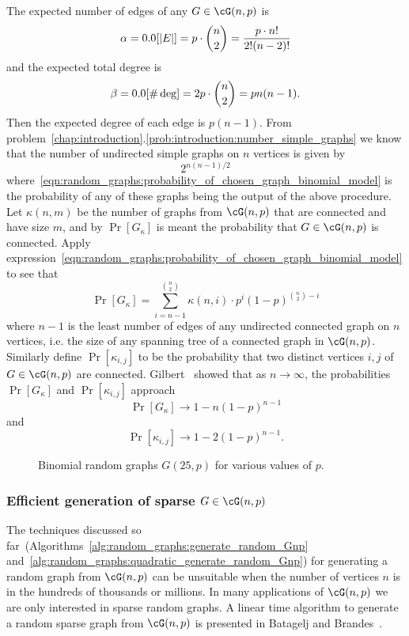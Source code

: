 The expected number of edges of any $G \in \cG(n,p)$ is
\[
\alpha
=
\E[|E|]
=
p \cdot \binom{n}{2}
=
\frac{p \cdot n!} {2! (n - 2)!}
\]
and the expected total degree is
\[
\beta
=
\E[\#\deg]
=
2p \cdot \binom{n}{2}
=
pn(n - 1).
\]
Then the expected degree of each edge is $p(n - 1)$. From
problem~\ref{chap:introduction}.\ref{prob:introduction:number_simple_graphs}
we know that the number of undirected simple graphs on $n$ vertices is
given by
\[
2^{n(n-1) / 2}
\]
where~\eqref{eqn:random_graphs:probability_of_chosen_graph_binomial_model}
is the probability of any of these graphs being the output of the
above procedure. Let $\kappa(n,m)$ be the number of graphs from
$\cG(n,p)$ that are connected and have size $m$, and by $\Pr[G_\kappa]$
is meant the probability that $G \in \cG(n,p)$ is connected. Apply
expression~\eqref{eqn:random_graphs:probability_of_chosen_graph_binomial_model}
to see that
\[
\Pr[G_\kappa]
=
\sum_{i=n-1}^{\binom{n}{2}}
\kappa(n,i) \cdot p^i (1 - p)^{\binom{n}{2} - i}
\]
where $n - 1$ is the least number of edges of any undirected connected
graph on $n$ vertices, i.e. the size of any spanning tree of a
connected graph in $\cG(n,p)$. Similarly define $\Pr[\kappa_{i,j}]$ to
be the probability that two distinct vertices $i,j$ of
$G \in \cG(n,p)$ are connected. Gilbert~\cite{Gilbert1959} showed that
as $n \to \infty$, the probabilities $\Pr[G_\kappa]$ and
$\Pr[\kappa_{i,j}]$ approach
\[
\Pr[G_\kappa] \to 1 - n(1 - p)^{n-1}
\]
and
\[
\Pr[\kappa_{i,j}] \to 1 - 2(1 - p)^{n-1}.
\]

\begin{figure}[!htbp]
\centering
{}

\caption{Binomial random graphs $G(25,p)$ for various values of $p$.}
\label{fig:random_graphs:binomial_random_graph_25_nodes}
\end{figure}



\subsubsection{Efficient generation of sparse $G \in \cG(n,p)$}

The techniques discussed so
far~(Algorithms~\ref{alg:random_graphs:generate_random_Gnp}
and~\ref{alg:random_graphs:quadratic_generate_random_Gnp}) for
generating a random graph from $\cG(n,p)$ can be unsuitable when the
number of vertices $n$ is in the hundreds of thousands or millions. In
many applications of $\cG(n,p)$ we are only interested in
sparse random graphs. A linear time algorithm to
generate a random sparse graph from $\cG(n,p)$ is presented in
Batagelj and
Brandes~\cite{BatageljBrandes2005}.

